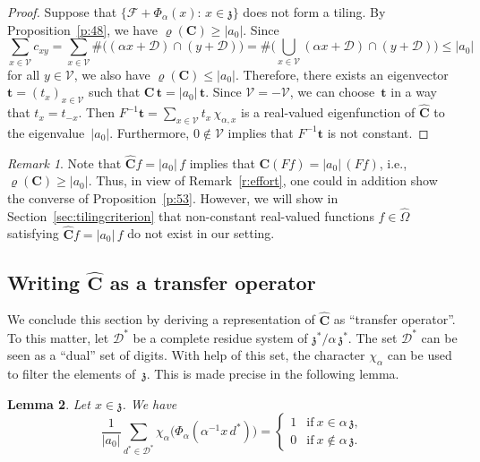 \documentclass[12pt]{amsart}
\newtheorem{lemma}{Lemma}[section]
\theoremstyle{definition}
\theoremstyle{remark}
\newtheorem{remark}[lemma]{Remark}
\numberwithin{equation}{section}
\begin{document}
\begin{proof}
Suppose that $\{\mathcal{F} + \Phi_\alpha(x):\, x \in \mathfrak{z}\}$ does not form a tiling.
By Proposition~\ref{p:48}, we have $\varrho(\mathbf{C}) \ge |a_0|$.
Since
\[
\sum_{x\in\mathcal{V}} c_{x y} = \sum_{x\in\mathcal{V}} \#\big((\alpha x + \mathcal{D}) \cap (y + \mathcal{D})\big) = \#\bigg(\bigcup_{x\in\mathcal{V}} (\alpha x + \mathcal{D}) \cap (y + \mathcal{D})\bigg) \le |a_0|
\]
for all $y \in\mathcal{V}$, we also have $\varrho(\mathbf{C}) \le |a_0|$.
Therefore, there exists an eigenvector $\mathbf{t} = (t_x)_{x\in\mathcal{V}}$ such that $\mathbf{C}\, \mathbf{t} = |a_0|\, \mathbf{t}$.
Since $\mathcal{V} = -\mathcal{V}$, we can choose~$\mathbf{t}$ in a way that $t_x = t_{-x}$.
Then $F^{-1} \mathbf{t} = \sum_{x\in\mathcal{V}} t_x\, \chi_{\alpha,x}$ is a real-valued eigenfunction of $\widehat{\mathbf{C}}$ to the eigenvalue~$|a_0|$.
Furthermore, $0 \not\in \mathcal{V}$ implies that $F^{-1} \mathbf{t}$ is not constant.
\end{proof}

\begin{remark}
Note that $\widehat{\mathbf{C}} f = |a_0|\, f$ implies that $\mathbf{C} (F f) = |a_0|\, (F f)$, i.e., $\varrho(\mathbf{C}) \ge |a_0|$.
Thus, in view of Remark~\ref{r:effort}, one could in addition show the converse of Proposition~\ref{p:53}.
However, we will show in Section~\ref{sec:tilingcriterion} that non-constant real-valued functions $f \in \widehat\Omega$ satisfying $\widehat{\mathbf{C}} f = |a_0|\, f$ do not exist in our setting.
\end{remark}

\subsection*{Writing $\widehat{\mathbf{C}}$ as a transfer operator}
We conclude this section by deriving a representation of $\widehat{\mathbf{C}}$ as ``transfer operator''.
To this matter, let $\mathcal{D}^*$ be a complete residue system of $\mathfrak{z}^* / \alpha\, \mathfrak{z}^*$.
The set $\mathcal{D}^*$ can be seen as a ``dual'' set of digits.
With help of this set, the character $\chi_\alpha$ can be used to filter the elements of~$\mathfrak{z}$.
This is made precise in the following lemma.

\begin{lemma} \label{l:511}
Let $x \in \mathfrak{z}$.
We have
\[
\frac{1}{|a_0|} \sum_{d^* \in \mathcal{D}^*} \chi_\alpha\big(\Phi_\alpha(\alpha^{-1} x\, d^*)\big) = \left\{\begin{array}{cl}1 & \mbox{if}\ x \in \alpha\, \mathfrak{z}, \\ 0 & \mbox{if}\ x \not\in \alpha\, \mathfrak{z}.\end{array}\right.
\]
\end{lemma}
\end{document}
